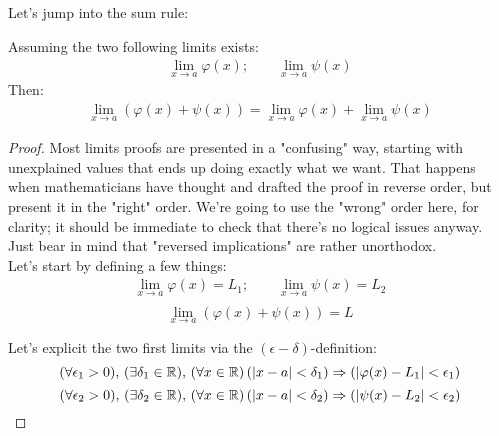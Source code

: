 \documentclass[solutions.tex]{subfiles}
\begin{document}
Let's jump into the sum rule:
\begin{theorem} Assuming the two following limits
exists:
\begin{equation*} \begin{aligned}
	\lim_{x \rightarrow a}\varphi(x);\qquad\lim_{x \rightarrow a}\psi(x)
\end{aligned} \end{equation*}
Then:
\begin{equation*} \begin{aligned}
	\boxed{\lim_{x \rightarrow a}\left(\varphi(x)+\psi(x)\right) =
		\lim_{x \rightarrow a}\varphi(x)
		+ \lim_{x \rightarrow a}\psi(x)}
\end{aligned} \end{equation*}
\end{theorem}
\begin{proof} Most limits proofs are presented in a "confusing"
way, starting with unexplained values that ends up doing exactly
what we want. That happens when mathematicians have thought and
drafted the proof in reverse order, but present it in the
"right" order. We're going to use the "wrong" order here, for
clarity; it should be immediate to check that there's no logical
issues anyway. Just bear in mind that "reversed implications" are
rather unorthodox. \\

Let's start by defining a few things:
\begin{equation*} \begin{aligned}
	\lim_{x \rightarrow a}\varphi(x) = L_1;\qquad\lim_{x \rightarrow a}\psi(x) = L_2 \\
\end{aligned} \end{equation*}
\[	\lim_{x \rightarrow a}\left(\varphi(x)+\psi(x)\right) = L \]

Let's explicit the two first limits via the $(\epsilon-\delta)$-definition:
\[ \epsdelta{\epsilon_1}{\delta_1}{a}{x}{\varphi(x)}{L_1}  \]
\[ \epsdelta{\epsilon_2}{\delta_2}{a}{x}{\psi(x)}{L_2}     \]


\end{proof}
\end{document}
